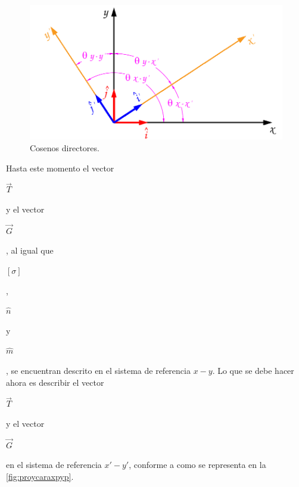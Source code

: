 \documentclass[12pt,letterpaper, twoside, openany]{article}
\begin{document}
%
\begin{figure}[H]
	\centering
		\includegraphics[width=11 cm]{img/Directores2D.pdf}
		\caption{Cosenos directores.}
		\label{fig:directores2D}
\end{figure}
%
Hasta este momento el vector \begin{large} $\overset{\rightarrow}{T}$\end{large} y  el vector \begin{large} $\overset{\rightarrow}{G}$\end{large}, al igual que  \begin{large} $\left[ \sigma \right]$\end{large}, \begin{large} $\hat{n}$\end{large} y \begin{large} $\hat{m}$\end{large}, se encuentran descrito en el sistema de referencia $x-y$. 
%
%
Lo que se debe hacer ahora es describir el vector \begin{large} $\overset{\rightarrow}{T}$\end{large} y el vector  \begin{large} $\overset{\rightarrow}{G}$\end{large} en el sistema de referencia $x'-y'$, conforme a como se representa en la \cref{fig:proycaraxpyp}.  
\end{document}
